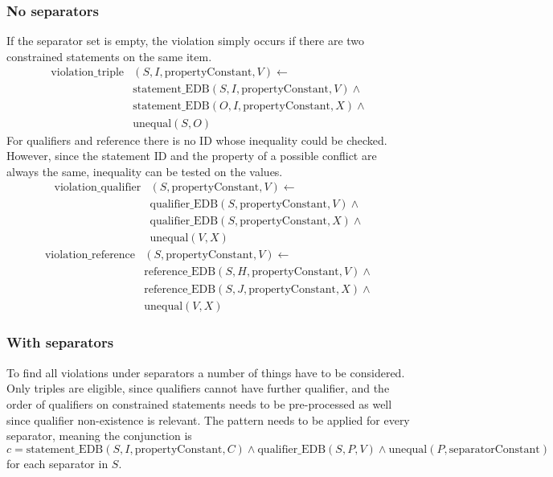 \documentclass[hyperref,bachelorofscience,fleqn]{cgvpub}
\begin{document}
\subsubsection{No separators}
If the separator set is empty, the violation simply occurs if there are two constrained statements on the same item. 
\begin{equation}\label{eq_no_separators_triple}
\begin{split}
\text{violation\_triple}&(S, I, \text{propertyConstant}, V) \leftarrow \\
&\text{statement\_EDB}(S, I, \text{propertyConstant}, V) \wedge{} \\
&\text{statement\_EDB}(O, I, \text{propertyConstant}, X) \wedge{} \\
&\text{unequal}(S, O)
\end{split}
\end{equation}
For qualifiers and reference there is no ID whose inequality could be checked. However, since the statement ID and the property of a possible conflict are always the same, inequality can be tested on the values.
\begin{equation*}
\begin{split}
\text{violation\_qualifier}&(S, \text{propertyConstant}, V) \leftarrow \\
&\text{qualifier\_EDB}(S, \text{propertyConstant}, V) \wedge{} \\
&\text{qualifier\_EDB}(S, \text{propertyConstant}, X) \wedge{} \\
&\text{unequal}(V, X)
\end{split}
\end{equation*}
\begin{equation*}
\begin{split}
\text{violation\_reference}&(S, \text{propertyConstant}, V) \leftarrow \\
&\text{reference\_EDB}(S, H, \text{propertyConstant}, V) \wedge{} \\
&\text{reference\_EDB}(S, J, \text{propertyConstant}, X) \wedge{} \\
&\text{unequal}(V, X)
\end{split}
\end{equation*}

\subsubsection{With separators}\label{subsubsec_with_separators}
To find all violations under separators a number of things have to be considered. Only triples are eligible, since qualifiers cannot have further qualifier, and the order of qualifiers on constrained statements needs to be pre-processed as well since qualifier non-existence is relevant. The pattern needs to be applied for every separator, meaning the conjunction is
\begin{equation*}
c = \text{statement\_EDB}(S, I, \text{propertyConstant}, C) \wedge \text{qualifier\_EDB}(S, P, V) \wedge \text{unequal}(P, \text{separatorConstant})
\end{equation*}
for each separator in \(S\).\\
\end{document}
